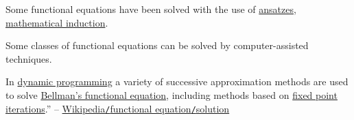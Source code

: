 \documentclass{article}
\numberwithin{equation}{section}
\begin{document}
Some functional equations have been solved with the use of \href{https://en.wikipedia.org/wiki/Ansatz}{ansatzes}, \href{https://en.wikipedia.org/wiki/Mathematical_induction}{mathematical induction}.

Some classes of functional equations can be solved by computer-assisted techniques.

In \href{https://en.wikipedia.org/wiki/Dynamic_programming}{dynamic programming} a variety of successive approximation methods are used to solve \href{https://en.wikipedia.org/wiki/Bellman_equation}{Bellman's functional equation}, including methods based on \href{https://en.wikipedia.org/wiki/Fixed_point_iteration}{fixed point iterations}.'' -- \href{https://en.wikipedia.org/wiki/Functional_equation#Solution}{Wikipedia\texttt{/}functional equation\texttt{/}solution}


\printbibliography[heading=bibintoc]
	
\end{document}
